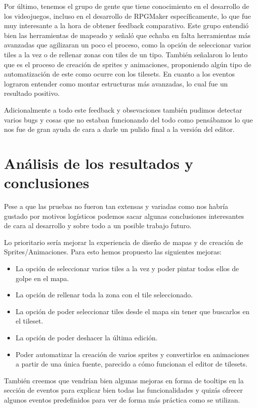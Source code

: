 \medskip

Por último, tenemos el grupo de gente que tiene conocimiento en el desarrollo de los videojuegos, incluso en el desarrollo de RPGMaker específicamente, lo que fue muy interesante a la hora de obtener feedback comparativo. Este grupo entendió bien las herramientas de mapeado y señaló que echaba en falta herramientas más avanzadas que agilizaran un poco el proceso, como la opción de seleccionar varios tiles a la vez o de rellenar zonas con tiles de un tipo. También señalaron lo lento que es el proceso de creación de sprites y animaciones, proponiendo algún tipo de automatización de este como ocurre con los tilesets. En cuanto a los eventos lograron entender como montar estructuras más avanzadas, lo cual fue un resultado positivo. 

\medskip

Adicionalmente a todo este feedback y obsevaciones también pudimos detectar varios bugs y cosas que no estaban funcionando del todo como pensábamos lo que nos fue de gran ayuda de cara a darle un pulido final a la versión del editor. 

\section{Análisis de los resultados y conclusiones}
Pese a que las pruebas no fueron tan extensas y variadas como nos habría gustado por motivos logísticos podemos sacar algunas conclusiones interesantes de cara al desarrollo y sobre todo a un posible trabajo futuro.

\smallskip 

Lo prioritario sería mejorar la experiencia de diseño de mapas y de creación de Sprites/Animaciones. Para esto hemos propuesto las siguientes mejoras:

\begin{itemize}
	\item La opción de seleccionar varios tiles a la vez y poder pintar todos ellos de golpe en el mapa. 

	\item La opción de rellenar toda la zona con el tile seleccionado. 

	\item La opción de poder seleccionar tiles desde el mapa sin tener que buscarlos en el tileset. 

	\item La opción de poder deshacer la última edición. 

	\item Poder automatizar la creación de varios sprites y convertirlos en animaciones a partir de una única fuente, parecido a cómo funcionan el editor de tilesets. 
\end{itemize}

También creemos que vendrían bien algunas mejoras en forma de tooltips en la sección de eventos para explicar bien todas las funcionalidades y quizás ofrecer algunos eventos predefinidos para ver de forma más práctica como se utilizan.


